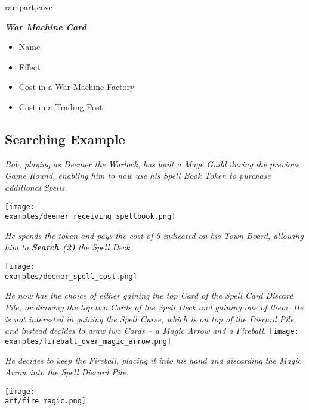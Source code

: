 \begin{multicols*}{2}
\begin{expansion}{rampart,cove}
  {
    \bigskip
    \centering
    \begin{scriptsize}
    \end{scriptsize}

    \footnotesize
    \textbf{\textit{\textcolor{darkcandyapplered}{War Machine Card}}}
    \begin{itemize}[itemsep=0pt, parsep=5pt, topsep=0pt, partopsep=0pt]
      \item[\textbf{1.}] Name
      \item[\textbf{2.}] Effect
      \item[\textbf{3.}] Cost in a War Machine Factory
      \item[\textbf{4.}] Cost in a Trading Post
    \end{itemize}
  }
\end{expansion}

\vspace*{\fill}

\subsection*{Searching Example}

\textit{Bob, playing as Deemer the Warlock, has built a Mage Guild during the previous Game Round, enabling him to now use his Spell Book Token to purchase additional Spells.}

\texttt{[image: \\examples/deemer\_receiving\_spellbook.png]}\par
\textit{He spends the token and pays the cost of 5  indicated on his Town Board, allowing him to \textbf{Search (2)} the Spell Deck.}\par
\texttt{[image: \\examples/deemer\_spell\_cost.png]}\par
\filbreak
\textit{He now has the choice of either gaining the top Card of the Spell Card Discard Pile, or drawing the top two Cards of the Spell Deck and gaining one of them.
He is not interested in gaining the Spell Curse, which is on top of the Discard Pile, and instead decides to draw two Cards – a Magic Arrow and a Fireball.}
\texttt{[image: \\examples/fireball\_over\_magic\_arrow.png]}\par
\textit{He decides to keep the Fireball, placing it into his hand and discarding the Magic Arrow into the Spell Discard Pile.}

\vspace*{\fill}

\hfill{\texttt{[image: \\art/fire\_magic.png]}}

\end{multicols*}
